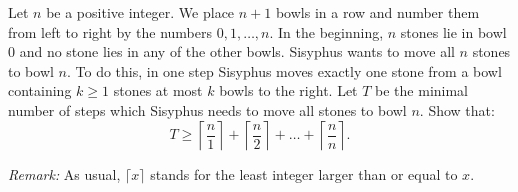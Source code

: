 Let $n$ be a positive integer.
We place $n+1$ bowls in a row and number them from left to right by the numbers $0,1,\ldots,n$.
In the beginning, $n$ stones lie in bowl $0$ and no stone lies in any of the other bowls.
Sisyphus wants to move all $n$ stones to bowl $n$.
To do this, in one step Sisyphus moves exactly one stone from a bowl containing $k\geq 1$ stones
at most $k$ bowls to the right.
Let $T$ be the minimal number of steps which Sisyphus needs to move all stones to bowl $n$.
Show that:
\[
    T\geq \left\lceil \frac{n}{1} \right\rceil + \left\lceil \frac{n}{2} \right\rceil
+ \ldots + \left\lceil \frac{n}{n} \right\rceil.
\]

\emph{Remark:} As usual, $\lceil x \rceil$ stands for the least integer larger than or equal to $x$.
